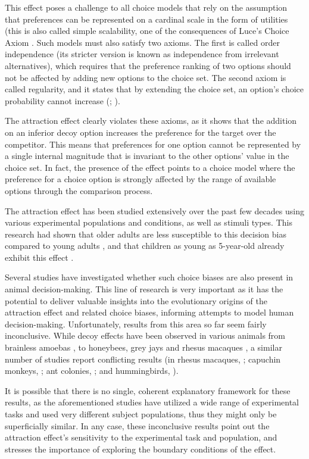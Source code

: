 \documentclass[11pt,a4paper]{article}
\begin{document}
This effect poses a challenge to all choice models that rely on the assumption that preferences can be represented on a cardinal scale in the form of utilities (this is also called simple scalability, one of the consequences of Luce's Choice Axiom \cite{Luce1959}. Such models must also satisfy two axioms. 
The first is called order independence (its stricter version is known as independence from irrelevant alternatives), which requires that the preference ranking of two options should not be affected by adding new options to the choice set. The second axiom is called regularity, and it states that by extending the choice set, an option's choice probability cannot increase (; ).

The attraction effect clearly violates these axioms, as it shows that the addition on an inferior decoy option increases the preference for the target over the competitor. This means that preferences for one option cannot be represented by a single internal magnitude that is invariant to the other options' value in the choice set. In fact, the presence of the effect points to a choice model where the preference for a choice option is strongly affected by the range of available options through the comparison process.

The attraction effect has been studied extensively over the past few decades using various experimental populations and conditions, as well as stimuli types. This research had shown that older adults are less susceptible to this decision bias compared to young adults \cite{Kim2005}, and that children as young as 5-year-old already exhibit this effect \cite{Zhen2016}. 

Several studies have investigated whether such choice biases are also present in animal decision-making. This line of research is very important as it has the potential to deliver valuable insights into the evolutionary origins of the attraction effect and related choice biases, informing attempts to model human decision-making. Unfortunately, results from this area so far seem fairly inconclusive. While decoy effects have been observed in various animals from brainless amoebas \cite{Latty2011}, to honeybees, grey jays \cite{Shafir2002} and rhesus macaques \cite{Parrish2015}, a similar number of studies report conflicting results (in rhesus macaques, ; capuchin monkeys, ; ant colonies, ; and hummingbirds, ). 

It is possible that there is no single, coherent explanatory framework for these results, as the aforementioned studies have utilized a wide range of experimental tasks and used very different subject populations, thus they might only be superficially similar. In any case, these inconclusive results point out the attraction effect's sensitivity to the experimental task and population, and stresses  the importance of exploring the boundary conditions of the effect. 
\end{document}
